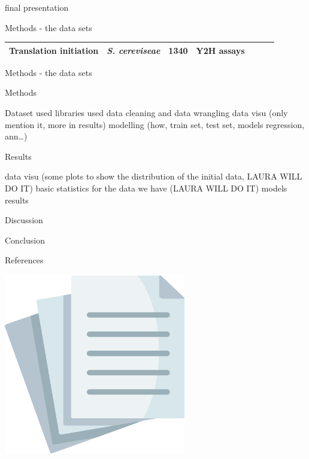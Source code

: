 \documentclass[ignorenonframetext,]{beamer}
\begin{document}
\begin{frame}{final presentation}
\begin{block}{Methods - the data sets}
\begin{longtable}[]{@{}lllllll@{}}
\begin{minipage}[t]{0.12\columnwidth}
Translation initiation\strut
\end{minipage} & \begin{minipage}[t]{0.08\columnwidth}\raggedright
\emph{S. cereviseae}\strut
\end{minipage} & \begin{minipage}[t]{0.08\columnwidth}\raggedright
1340\strut
\end{minipage} & \begin{minipage}[t]{0.30\columnwidth}\raggedright
Y2H assays\strut
\end{minipage}\tabularnewline
\bottomrule
\end{longtable}

\end{block}

\begin{block}{Methods - the data sets}

\end{block}

\begin{block}{Methods}

Dataset used libraries used data cleaning and data wrangling data visu
(only mention it, more in results) modelling (how, train set, test set,
models regression, ann\ldots{})

\end{block}

\begin{block}{Results}

data visu (some plots to show the distribution of the initial data,
LAURA WILL DO IT) basic statistics for the data we have (LAURA WILL DO
IT) models results

\end{block}

\begin{block}{Discussion}

\end{block}

\begin{block}{Conclusion}

\end{block}

\begin{block}{References}

\includegraphics[width=3.125in,height=\textheight]{file.png}


\end{block}
\end{frame}
\end{document}
